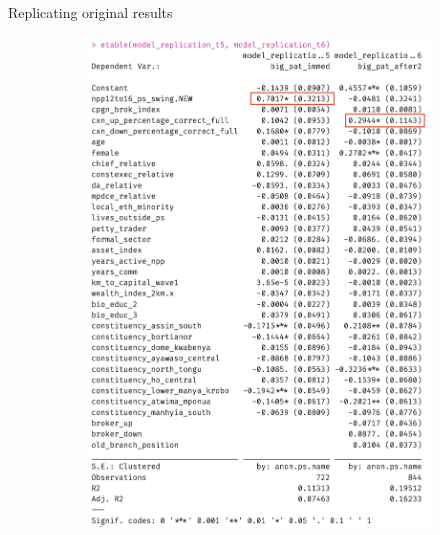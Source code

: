 \documentclass[10pt,table,aspectratio=169]{beamer}
\begin{document}
\begin{frame}[plain, label = two_dimensions]{Replicating original results}
\begin{figure}[H]
\begin{subfigure}{0.3\textwidth}
        \includegraphics[width=\linewidth]{figures/observational_replication_feols.png}
    \end{subfigure}
\end{figure}

\end{frame}
\end{document}
